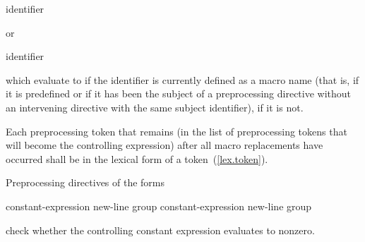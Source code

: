 \begin{ncsimplebnf}
 identifier
\end{ncsimplebnf}

or

\begin{ncsimplebnf}
 identifier \terminal{)}
\end{ncsimplebnf}

which evaluate to
if the identifier is currently defined
as a macro name
(that is, if it is predefined
or if it has been the subject of a
preprocessing directive
without an intervening
directive with the same subject identifier),  if it is not.

\pnum
Each preprocessing token that remains (in the list of preprocessing tokens that
will become the controlling expression)
after all macro replacements have occurred
shall be in the lexical form of a token~(\ref{lex.token}).

\pnum
Preprocessing directives of the forms

\begin{ncbnftab}
%
\>\>constant-expression new-line group\opt\br
{}%
\>\>constant-expression new-line group\opt
\end{ncbnftab}

check whether the controlling constant expression evaluates to nonzero.

